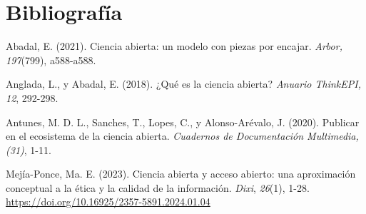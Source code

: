 \documentclass[
  latterpaper,
  DIV=11,
  numbers=noendperiod]{scrartcl}
\newlength{\cslhangindent}
\newenvironment{CSLReferences}[2] %
 {\begin{list}{}{%
  \setlength{\itemindent}{0pt}
  \setlength{\leftmargin}{0pt}
  \setlength{\parsep}{0pt}
  \ifodd #1
   \setlength{\leftmargin}{\cslhangindent}
   \setlength{\itemindent}{-1\cslhangindent}
  \fi
  \setlength{\itemsep}{#2\baselineskip}}}
 {\end{list}}
\begin{document}
\section{Bibliografía}

Abadal, E. (2021). Ciencia abierta: un modelo con piezas por encajar.
\emph{Arbor, 197}(799), a588-a588.

Anglada, L., y Abadal, E. (2018). ¿Qué es la ciencia abierta?
\emph{Anuario ThinkEPI, 12}, 292-298.

Antunes, M. D. L., Sanches, T., Lopes, C., y Alonso-Arévalo, J. (2020).
Publicar en el ecosistema de la ciencia abierta. \emph{Cuadernos de
Documentación Multimedia, (31)}, 1-11.

\label{refs}
\begin{CSLReferences}{1}{0}
Mejía-Ponce, Ma. E. (2023). Ciencia abierta y acceso abierto: una
aproximación conceptual a la ética y la calidad de la información.
\emph{Dixi}, \emph{26}(1), 1-28.
\url{https://doi.org/10.16925/2357-5891.2024.01.04}

\end{CSLReferences}
\end{document}
